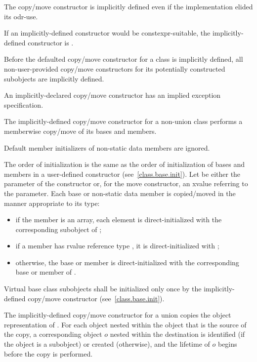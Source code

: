 \pnum
\begin{note}
The copy/move constructor is implicitly defined even if the implementation elided
its odr-use.
\end{note}
If an implicitly-defined constructor would be constexpr-suitable,
the implicitly-defined
constructor is .

\pnum
Before the defaulted copy/move constructor for a class is
implicitly defined,
all non-user-provided copy/move constructors for its
potentially constructed subobjects
are implicitly defined.
\begin{note}
An implicitly-declared copy/move constructor has an
implied exception specification.
\end{note}

\pnum
The implicitly-defined copy/move constructor for a non-union class
performs a memberwise copy/move of its bases and members.
\begin{note}
Default member initializers of non-static data members are ignored.
\end{note}
The order of initialization is the same as the order of initialization of bases
and members in a user-defined constructor (see~\ref{class.base.init}).
Let  be either the parameter of the constructor or, for the move constructor, an
xvalue referring to the parameter.
Each base or non-static data member
is copied/moved in the manner appropriate to its type:
\begin{itemize}
\item
if the member is an array, each element is
direct-initialized with the corresponding subobject of ;

\item
if a member  has rvalue reference type , it is direct-initialized with
;

\item
otherwise, the base or member is direct-initialized with the corresponding base or member of .
\end{itemize}

%
Virtual base class subobjects shall be initialized only once by
the implicitly-defined copy/move constructor (see~\ref{class.base.init}).

\pnum
The implicitly-defined copy/move constructor for a union
 copies the object representation of .
For each object nested within
the object that is the source of the copy,
a corresponding object $o$ nested within the destination
is identified (if the object is a subobject) or created (otherwise),
and the lifetime of $o$ begins before the copy is performed.


